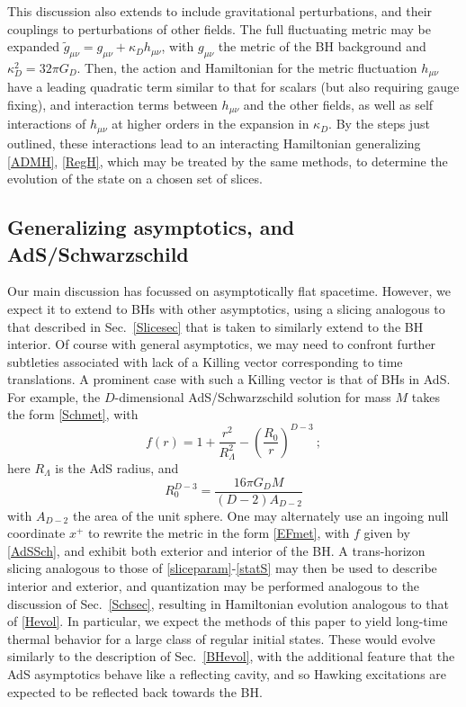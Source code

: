 \documentclass[12pt]{article}
\numberwithin{equation}{section}
\newcommand{\beq}{\begin{equation}}
\newcommand{\eeq}{\end{equation}}
\begin{document}
This discussion also extends to include gravitational perturbations, and their couplings to perturbations of other fields.  The full fluctuating metric may be expanded $\tilde g_{\mu\nu} = g_{\mu\nu}+ \kappa_D h_{\mu\nu}$, with $g_{\mu\nu}$ the metric of the BH background and $\kappa_D^2 =32\pi G_D$.  Then, the action and Hamiltonian for the metric fluctuation $h_{\mu\nu}$ have a leading quadratic term similar to that for scalars (but also requiring gauge fixing), and interaction terms between $h_{\mu\nu}$ and the other fields, as well as self interactions of $h_{\mu\nu}$ at higher orders in the expansion in $\kappa_D$.  By the steps just outlined, these interactions lead to an interacting Hamiltonian generalizing \eqref{ADMH},  \eqref{RegH}, which may be treated by the same methods, to determine the evolution of the state on a chosen set of slices.  

\subsection{Generalizing asymptotics, and AdS/Schwarzschild}

Our main discussion has focussed on asymptotically flat spacetime.  However, we expect it to extend to BHs with other asymptotics, using a slicing analogous to that described in Sec.~\ref{Slicesec} that is taken to similarly extend to the BH interior.  Of course with general asymptotics, we may need to confront further subtleties associated with lack of a Killing vector corresponding to time translations.  A prominent case with such a Killing vector is that of BHs in AdS.  For example, the $D$-dimensional AdS/Schwarzschild solution for mass $M$ takes the form \eqref{Schmet}, with
\beq\label{AdSSch}
f(r) = 1 + \frac{r^2}{R_\Lambda^2} - \left(\frac{R_0}{r}\right)^{D-3}\ ;
\eeq
here $R_\Lambda$ is the AdS radius, and 
\beq
R_0^{D-3} = \frac{16\pi G_D M}{(D-2)A_{D-2}}
\eeq
with $A_{D-2}$ the area of the unit sphere.  One may alternately use an ingoing null coordinate $x^+$ to rewrite the metric in the form \eqref{EFmet}, with $f$ given by \eqref{AdSSch}, and exhibit both exterior and interior of the BH.  A trans-horizon slicing analogous to those of \eqref{sliceparam}-\eqref{statS} may then be used to describe interior and exterior, and quantization may be performed analogous to the discussion of Sec.~\ref{Schsec}, resulting in  Hamiltonian evolution analogous to that of \eqref{Hevol}.  In particular, we expect the methods of this paper to yield long-time thermal behavior for a large class of regular initial states.  These would evolve similarly to the description of  Sec.~\ref{BHevol}, with the additional feature that the AdS asymptotics behave like a reflecting cavity, and so Hawking excitations are expected to be reflected back towards the BH.  
\end{document}
